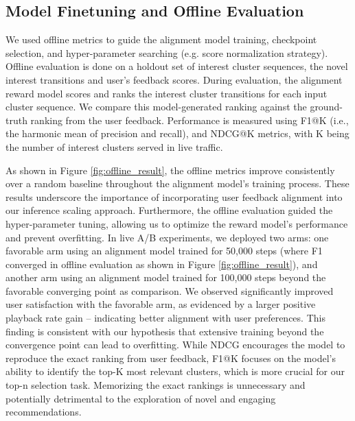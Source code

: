 \documentclass[11pt]{article}
\begin{document}
\subsection{Model Finetuning and Offline Evaluation}
We used offline metrics to guide the alignment model training, checkpoint selection, and hyper-parameter searching (e.g. score normalization strategy). Offline evaluation is done on a holdout set of interest cluster sequences, the novel interest transitions and user's feedback scores. During evaluation, the alignment reward model scores and ranks the interest cluster transitions for each input cluster sequence. We compare this model-generated ranking against the ground-truth ranking from the user feedback. Performance is measured using F1@K (i.e., the harmonic mean of precision and recall), and NDCG@K metrics, with K being the number of interest clusters served in live traffic.

As shown in Figure \ref{fig:offline_result}, the offline metrics improve consistently over a random baseline  throughout the alignment model's training process. These results underscore the importance of incorporating user feedback alignment into our inference scaling approach. Furthermore, the offline evaluation guided the hyper-parameter tuning, allowing us to optimize the reward model's performance and prevent overfitting. In live A/B experiments, we deployed two arms: one favorable arm using an alignment model trained for 50,000 steps (where F1 converged in offline evaluation as shown in Figure \ref{fig:offline_result}), and another arm using an alignment model trained for 100,000 steps beyond the favorable converging point as comparison. We observed significantly improved user satisfaction with the favorable arm, as evidenced by a larger positive playback rate gain – indicating better alignment with user preferences. This finding is consistent with our hypothesis that extensive training beyond the convergence point can lead to overfitting. While NDCG encourages the model to reproduce the exact ranking from user feedback, F1@K focuses on the model's ability to identify the top-K most relevant clusters, which is more crucial for our top-n selection task. Memorizing the exact rankings is unnecessary and potentially detrimental to the exploration of novel and engaging recommendations. 
\end{document}

